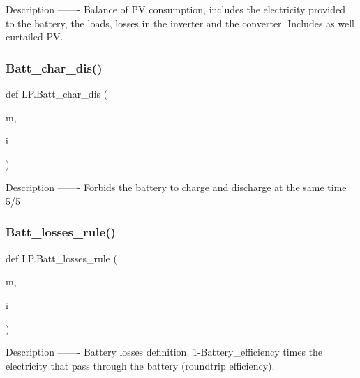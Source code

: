\begin{DoxyVerb}Description
-------
Balance of PV consumption, includes the electricity provided to the battery, the loads, losses in the inverter and the converter. Includes as well curtailed PV.
\end{DoxyVerb}
 \mbox{\label{namespace_l_p_acce964cd8e67ad18d750c9dd5b793ea9}} 
\subsubsection{\texorpdfstring{Batt\+\_\+char\+\_\+dis()}{Batt\_char\_dis()}}
{\footnotesize\ttfamily def L\+P.\+Batt\+\_\+char\+\_\+dis (\begin{DoxyParamCaption}\item[{}]{m,  }\item[{}]{i }\end{DoxyParamCaption})}

\begin{DoxyVerb}Description
-------
Forbids the battery to charge and discharge at the same time 5/5
\end{DoxyVerb}
 \mbox{\label{namespace_l_p_a25895a3a7f6a2f6e7a24db67779a7232}} 
\subsubsection{\texorpdfstring{Batt\+\_\+losses\+\_\+rule()}{Batt\_losses\_rule()}}
{\footnotesize\ttfamily def L\+P.\+Batt\+\_\+losses\+\_\+rule (\begin{DoxyParamCaption}\item[{}]{m,  }\item[{}]{i }\end{DoxyParamCaption})}

\begin{DoxyVerb}Description
-------
Battery losses definition. 1-Battery_efficiency times the electricity that pass through the battery (roundtrip efficiency).
\end{DoxyVerb}
 \mbox{\label{namespace_l_p_adad40054f3f8a78955c488f1ece50fed}} 
